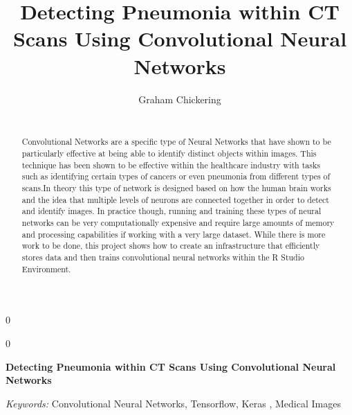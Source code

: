 \documentclass[12pt]{article}
\newcommand{\blind}{0}
\begin{document}
\def\spacingset#1{\renewcommand{\baselinestretch}%
{#1}\small\normalsize} \spacingset{1}



\blind
{
  \title{\bf Detecting Pneumonia within CT Scans Using Convolutional Neural Networks}

  \author{
        Graham Chickering \\
    \\
      }
  \maketitle
} \fi

\blind
{
  \bigskip
  \bigskip
  \bigskip
  \begin{center}
    {\LARGE\bf Detecting Pneumonia within CT Scans Using Convolutional Neural Networks}
  \end{center}
  \medskip
} \fi

\bigskip
\begin{abstract}
Convolutional Networks are a specific type of Neural Networks that have
shown to be particularly effective at being able to identify distinct
objects within images. This technique has been shown to be effective
within the healthcare industry with tasks such as identifying certain
types of cancers or even pneumonia from different types of scans.In
theory this type of network is designed based on how the human brain
works and the idea that multiple levels of neurons are connected
together in order to detect and identify images. In practice though,
running and training these types of neural networks can be very
computationally expensive and require large amounts of memory and
processing capabilities if working with a very large dataset. While
there is more work to be done, this project shows how to create an
infrastructure that efficiently stores data and then trains
convolutional neural networks within the R Studio Environment.
\end{abstract}

\noindent%
{\it Keywords:} Convolutional Neural Networks, Tensorflow, Keras , Medical Images
\vfill

\newpage
\spacingset{1.45} %
\end{document}
